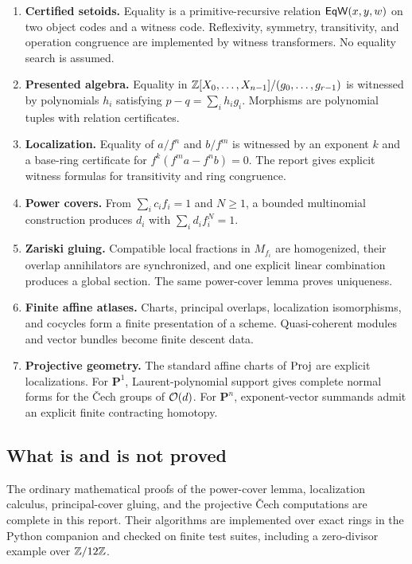 \begin{enumerate}[label=\textbf{C\arabic*.}]
\item \textbf{Certified setoids.}  Equality is a primitive-recursive relation
      $\mathsf{EqW}(x,y,w)$ on two object codes and a witness code.  Reflexivity, symmetry,
      transitivity, and operation congruence are implemented by witness transformers.  No equality
      search is assumed.
\item \textbf{Presented algebra.}  Equality in
      $\mathbb Z[X_0,\ldots,X_{n-1}]/(g_0,\ldots,g_{r-1})$ is witnessed by polynomials
      $h_i$ satisfying $p-q=\sum_i h_i g_i$.  Morphisms are polynomial tuples with relation
      certificates.
\item \textbf{Localization.}  Equality of $a/f^n$ and $b/f^m$ is witnessed by an exponent $k$
      and a base-ring certificate for
      $f^k(f^m a-f^n b)=0$.  The report gives explicit witness formulas for transitivity and ring
      congruence.
\item \textbf{Power covers.}  From $\sum_i c_i f_i=1$ and $N\geq1$, a bounded multinomial
      construction produces $d_i$ with $\sum_i d_i f_i^N=1$.
\item \textbf{Zariski gluing.}  Compatible local fractions in $M_{f_i}$ are homogenized, their
      overlap annihilators are synchronized, and one explicit linear combination produces a global
      section.  The same power-cover lemma proves uniqueness.
\item \textbf{Finite affine atlases.}  Charts, principal overlaps, localization isomorphisms, and
      cocycles form a finite presentation of a scheme.  Quasi-coherent modules and vector bundles
      become finite descent data.
\item \textbf{Projective geometry.}  The standard affine charts of $\operatorname{Proj}$ are explicit
      localizations.  For $\mathbf P^1$, Laurent-polynomial support gives complete normal forms for
      the \v{C}ech groups of $\mathcal O(d)$.  For $\mathbf P^n$, exponent-vector summands admit an
      explicit finite contracting homotopy.
\end{enumerate}

\subsection{What is and is not proved}

The ordinary mathematical proofs of the power-cover lemma, localization calculus, principal-cover
gluing, and the projective \v{C}ech computations are complete in this report.  Their algorithms are
implemented over exact rings in the Python companion and checked on finite test suites, including a
zero-divisor example over $\mathbb Z/12\mathbb Z$.

